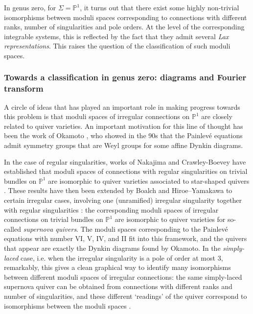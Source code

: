\documentclass[11pt,a4paper]{amsart}
\numberwithin{equation}{section}
\begin{document}
In genus zero, for $\Sigma=\mathbb P^1$, it turns out that there exist some highly non-trivial isomorphisms between moduli spaces corresponding to connections with different ranks, number of singularities and pole orders. At the level of the corresponding integrable systems, this is reflected by the fact that they admit several \emph{Lax representations}. This raises the question of the classification of such moduli spaces.\\

\subsubsection{Towards a classification in genus zero: diagrams and Fourier transform} A circle of ideas that has played an important role in making progress towards this problem is that moduli spaces of irregular connections on $\mathbb P^1$ are closely related to quiver varieties. An important motivation for this line of thought has been the work of Okamoto \cite{okamoto1992painleve}, who showed in the 90s that the Painlevé equations admit symmetry groups that are Weyl groups for some affine Dynkin diagrams. 

In the case of regular singularities, works of Nakajima and Crawley-Boevey have established that moduli spaces of connections with regular singularities on trivial bundles on $\mathbb P^1$ are isomorphic to quiver varieties associated to star-shaped quivers \cite{nakajima1994instantons, crawley2003matrices}. These results have then been extended by Boalch and Hiroe--Yamakawa to certain irregular cases, involving one (unramified) irregular singularity together with regular singularities \cite{boalch2008irregular, boalch2012simply, hiroe2014moduli}: the corresponding moduli spaces of irregular connections on trivial bundles on $\mathbb P^1$ are isomorphic to quiver varieties for so-called \emph{supernova quivers}. The moduli spaces corresponding to the Painlevé equations with number VI, V, IV, and II fit into this framework, and the quivers that appear are exactly the Dynkin diagrams found by Okamoto. In the \emph{simply-laced} case, i.e. when the irregular singularity is a pole of order at most 3, remarkably, this gives a clean graphical way to identify many isomorphisms between different moduli spaces of irregular connections: the same simply-laced supernova quiver can be obtained from connections with different ranks and number of singularities, and these different `readings' of the quiver correspond to isomorphisms between the moduli spaces \cite{boalch2012simply, boalch2016global}.
\end{document}

